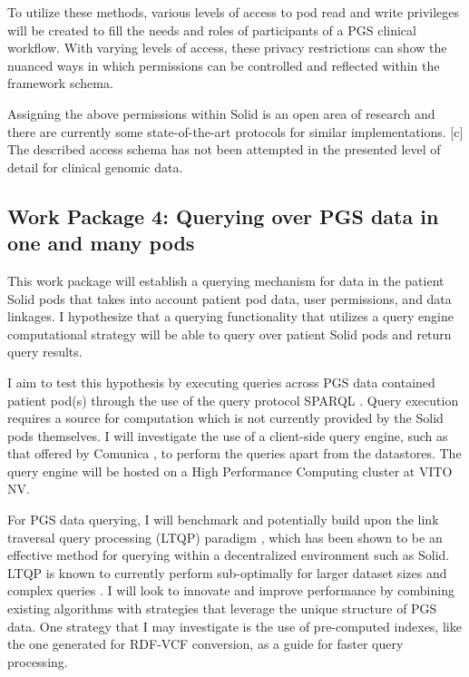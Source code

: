 \documentclass[runningheads]{llncs}
\begin{document}
To utilize these methods, various levels of access to pod read and write privileges will be created to fill the needs and roles of participants of a PGS clinical workflow. 
With varying levels of access, these privacy restrictions can show the nuanced ways in which permissions can be controlled and reflected within the framework schema.

Assigning the above permissions within Solid is an open area of research and there are currently some state-of-the-art protocols for similar implementations. [c]
The described access schema has not been attempted in the presented level of detail for clinical genomic data.


\subsection{Work Package 4: Querying over PGS data in one and many pods}

This work package will establish a querying mechanism for data in the patient Solid pods that takes into account patient pod data, user permissions, and data linkages. 
I hypothesize that a querying functionality that utilizes a query engine computational strategy will be able to query over patient Solid pods and return query results.

I aim to test this hypothesis by executing queries across PGS data contained patient pod(s) through the use of the query protocol SPARQL \cite{sparql}. 
Query execution requires a source for computation which is not currently provided by the Solid pods themselves.
I will investigate the use of a client-side query engine, such as that offered by Comunica \cite{comunica}, to perform the queries apart from the datastores.
The query engine will be hosted on a High Performance Computing cluster at VITO NV.

For PGS data querying, I will benchmark and potentially build upon the link traversal query processing (LTQP) paradigm \cite{taelman_evaluation_2023}, which has been shown to be an effective method for querying within a decentralized environment such as Solid. 
LTQP is known to currently perform sub-optimally for larger dataset sizes and complex queries \cite{taelman_evaluation_2023}. 
I will look to innovate and improve performance by combining existing algorithms with strategies that leverage the unique structure of PGS data.
One strategy that I may investigate is the use of pre-computed indexes, like the one generated for RDF-VCF conversion, as a guide for faster query processing.
\end{document}
